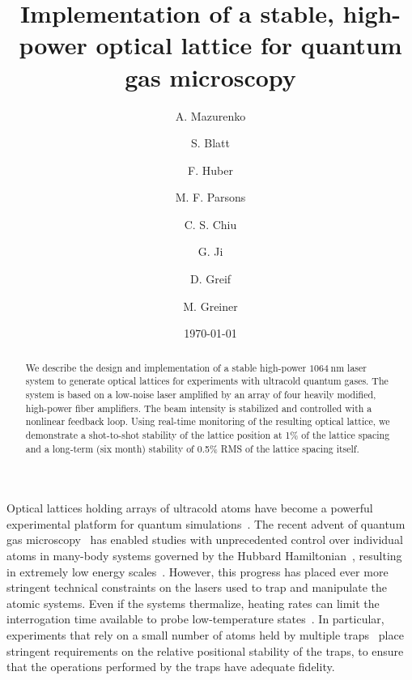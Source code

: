 \documentclass[twocolumn,aps,pra,showpacs,preprintnumbers,bibnotes]{revtex4-1}
\newcommand\unit[2]{\ensuremath{#1~\mathrm{{#2}}}}
\newcommand\FIXME{{\color{red}\ensuremath{\mathrm{FIXME}}}}
\begin{document}
\title{Implementation of a stable, high-power optical lattice for quantum gas microscopy}

\author{A. Mazurenko}
\altaffiliation{
  Present address: \FIXME{}}
\author{S. Blatt}
\author{F. Huber}
\author{M. F. Parsons}
\altaffiliation{
  Present address: \FIXME{} TOO}
\author{C. S. Chiu}
\author{G. Ji}
\author{D. Greif}
\author{M. Greiner}

\date{\today}
\begin{abstract}
  We describe the design and implementation of a stable high-power \unit{1064}{nm} laser system to generate optical lattices for experiments with ultracold quantum gases. The system is based on a low-noise laser amplified by an array of four heavily modified, high-power fiber amplifiers. The beam intensity is stabilized and controlled with a nonlinear feedback loop. Using real-time monitoring of the resulting optical lattice, we demonstrate a shot-to-shot stability of the lattice position at 1\% of the lattice spacing and a long-term (six month) stability of 0.5\% RMS of the lattice spacing itself.
\end{abstract}
\maketitle

Optical lattices holding arrays of ultracold atoms have become a powerful experimental platform for quantum simulations~\cite{Friedenauer2008, Kim2010, Struck2011, Simon2011, Yan2013, Drewes2016, Murmann2015}.
The recent advent of quantum gas microscopy~\cite{Bakr2009, Sherson2010, Haller2015, Cheuk2015, Parsons2015, Edge2015, Omran2015, Greif2016, Cheuk2016, Parsons2016, Boll2016, Cheuk2016a, Brown2017} has enabled studies with unprecedented control over individual atoms in many-body systems governed by the Hubbard Hamiltonian~\cite{Hubbard1963}, resulting in extremely low energy scales~\cite{Mazurenko2017}.
However, this progress has placed ever more stringent technical constraints on the lasers used to trap and manipulate the atomic systems.
Even if the systems thermalize, heating rates can limit the interrogation time available to probe low-temperature states~\cite{Blatt2015}.
In particular, experiments that rely on a small number of atoms held by multiple traps~\cite{Preiss2015, Choi2016, Mazurenko2017} place stringent requirements on the relative positional stability of the traps, to ensure that the operations performed by the traps have adequate fidelity.
\end{document}
